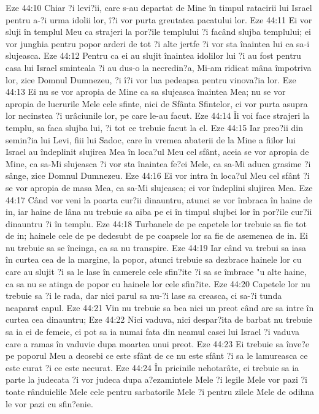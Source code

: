 Eze 44:10  Chiar ?i levi?ii, care s-au departat de Mine în timpul ratacirii lui Israel pentru a-?i urma idolii lor, î?i vor purta greutatea pacatului lor.
Eze 44:11  Ei vor sluji în templul Meu ca strajeri la por?ile templului ?i facând slujba templului; ei vor junghia pentru popor arderi de tot ?i alte jertfe ?i vor sta înaintea lui ca sa-i slujeasca.
Eze 44:12  Pentru ca ei au slujit înaintea idolilor lui ?i au fost pentru casa lui Israel sminteala ?i au dus-o la necredin?a, Mi-am ridicat mâna împotriva lor, zice Domnul Dumnezeu, ?i î?i vor lua pedeapsa pentru vinova?ia lor.
Eze 44:13  Ei nu se vor apropia de Mine ca sa slujeasca înaintea Mea; nu se vor apropia de lucrurile Mele cele sfinte, nici de Sfânta Sfintelor, ci vor purta asupra lor necinstea ?i urâciunile lor, pe care le-au facut.
Eze 44:14  Îi voi face strajeri la templu, sa faca slujba lui, ?i tot ce trebuie facut la el.
Eze 44:15  Iar preo?ii din semin?ia lui Levi, fiii lui Sadoc, care în vremea abaterii de la Mine a fiilor lui Israel au îndeplinit slujirea Mea în loca?ul Meu cel sfânt, aceia se vor apropia de Mine, ca sa-Mi slujeasca ?i vor sta înaintea fe?ei Mele, ca sa-Mi aduca grasime ?i sânge, zice Domnul Dumnezeu.
Eze 44:16  Ei vor intra în loca?ul Meu cel sfânt ?i se vor apropia de masa Mea, ca sa-Mi slujeasca; ei vor îndeplini slujirea Mea.
Eze 44:17  Când vor veni la poarta cur?ii dinauntru, atunci se vor îmbraca în haine de in, iar haine de lâna nu trebuie sa aiba pe ei în timpul slujbei lor în por?ile cur?ii dinauntru ?i în templu.
Eze 44:18  Turbanele de pe capetele lor trebuie sa fie tot de in; hainele cele de pe dedesubt de pe coapsele lor sa fie de asemenea de in. Ei nu trebuie sa se încinga, ca sa nu transpire.
Eze 44:19  Iar când va trebui sa iasa în curtea cea de la margine, la popor, atunci trebuie sa dezbrace hainele lor cu care au slujit ?i sa le lase în camerele cele sfin?ite ?i sa se îmbrace "u alte haine, ca sa nu se atinga de popor cu hainele lor cele sfin?ite.
Eze 44:20  Capetele lor nu trebuie sa ?i le rada, dar nici parul sa nu-?i lase sa creasca, ci sa-?i tunda neaparat capul.
Eze 44:21  Vin nu trebuie sa bea nici un preot când are sa intre în curtea cea dinauntru;
Eze 44:22  Nici vaduva, nici despar?ita de barbat nu trebuie sa ia ei de femeie, ci pot sa ia numai fata din neamul casei lui Israel ?i vaduva care a ramas în vaduvie dupa moartea unui preot.
Eze 44:23  Ei trebuie sa înve?e pe poporul Meu a deosebi ce este sfânt de ce nu este sfânt ?i sa le lamureasca ce este curat ?i ce este necurat.
Eze 44:24  În pricinile nehotarâte, ei trebuie sa ia parte la judecata ?i vor judeca dupa a?ezamintele Mele ?i legile Mele vor pazi ?i toate rânduielile Mele cele pentru sarbatorile Mele ?i pentru zilele Mele de odihna le vor pazi cu sfin?enie.
